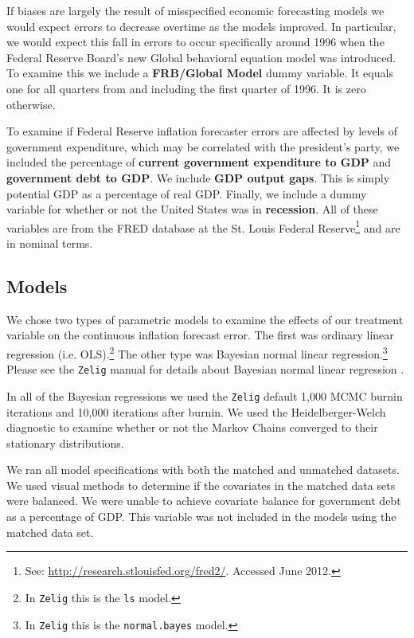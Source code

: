 \documentclass[a4paper]{article}\usepackage{graphicx, color}
\begin{document}
If biases are largely the result of misspecified economic forecasting models we would expect errors to decrease overtime as the models improved. In particular, we would expect this fall in errors to occur specifically around 1996 when the Federal Reserve Board's new Global behavioral equation model was introduced. To examine this we include a {\bf{FRB/Global Model}} dummy variable. It equals one for all quarters from and including the first quarter of 1996. It is zero otherwise.

To examine if Federal Reserve inflation forecaster errors are affected by levels of government expenditure, which may be correlated with the president's party, we included the percentage of {\bf{current government expenditure to GDP}} and {\bf{government debt to GDP}}. We include {\bf{GDP output gaps}}. This is simply potential GDP as a percentage of real GDP. Finally, we include a dummy variable for whether or not the United States was in {\bf{recession}}. All of these variables are from the FRED database at the St. Louis Federal Reserve\footnote{See: {\url{http://research.stlouisfed.org/fred2/}}. Accessed June 2012.} and are in nominal terms.

\subsection{Models}

We chose two types of parametric models to examine the effects of our treatment variable on the continuous inflation forecast error. The first was ordinary linear regression (i.e. OLS).\footnote{In {\tt{Zelig}} this is the {\tt{ls}} model.} The other type was Bayesian normal linear regression.\footnote{In {\tt{Zelig}} this is the {\tt{normal.bayes}} model.} Please see the {\tt{Zelig}} manual for details about Bayesian normal linear regression \citep{Goodrich2007}. 

In all of the Bayesian regressions we used the {\tt{Zelig}} default 1,000 MCMC burnin iterations and 10,000 iterations after burnin. We used the Heidelberger-Welch diagnostic to examine whether or not the Markov Chains converged to their stationary distributions.

We ran all model specifications with both the matched and unmatched datasets. We used visual methods to determine if the covariates in the matched data sets were balanced. We were unable to achieve covariate balance for government debt as a percentage of GDP. This variable was not included in the models using the matched data set.
\end{document}
